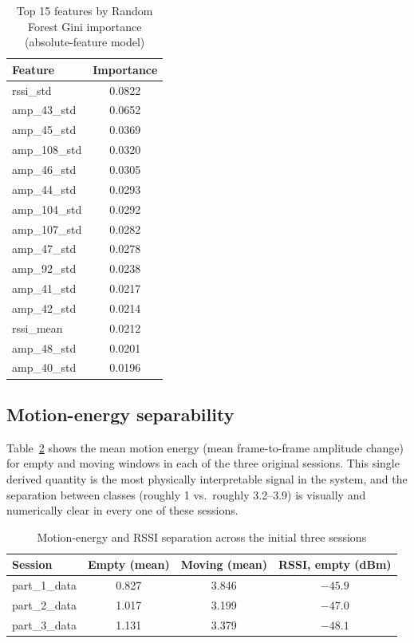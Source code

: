 \documentclass[11pt,a4paper]{article}
\begin{document}
\begin{table}[h]
\centering
\begin{tabular}{lc}
\toprule
\textbf{Feature} & \textbf{Importance} \\
\midrule
rssi\_std      & 0.0822 \\
amp\_43\_std   & 0.0652 \\
amp\_45\_std   & 0.0369 \\
amp\_108\_std  & 0.0320 \\
amp\_46\_std   & 0.0305 \\
amp\_44\_std   & 0.0293 \\
amp\_104\_std  & 0.0292 \\
amp\_107\_std  & 0.0282 \\
amp\_47\_std   & 0.0278 \\
amp\_92\_std   & 0.0238 \\
amp\_41\_std   & 0.0217 \\
amp\_42\_std   & 0.0214 \\
rssi\_mean     & 0.0212 \\
amp\_48\_std   & 0.0201 \\
amp\_40\_std   & 0.0196 \\
\bottomrule
\end{tabular}
\caption{Top 15 features by Random Forest Gini importance (absolute-feature model)}
\label{tab:importance}
\end{table}

\subsection{Motion-energy separability}

Table~\ref{tab:motionenergy} shows the mean motion energy (mean
frame-to-frame amplitude change) for empty and moving windows in each of
the three original sessions. This single derived quantity is the most
physically interpretable signal in the system, and the separation
between classes (roughly 1 vs.\ roughly 3.2--3.9) is visually and
numerically clear in every one of these sessions.

\begin{table}[h]
\centering
\begin{tabular}{lccc}
\toprule
\textbf{Session} & \textbf{Empty (mean)} & \textbf{Moving (mean)} & \textbf{RSSI, empty (dBm)} \\
\midrule
part\_1\_data & 0.827 & 3.846 & $-45.9$ \\
part\_2\_data & 1.017 & 3.199 & $-47.0$ \\
part\_3\_data & 1.131 & 3.379 & $-48.1$ \\
\bottomrule
\end{tabular}
\caption{Motion-energy and RSSI separation across the initial three sessions}
\label{tab:motionenergy}
\end{table}
\end{document}
